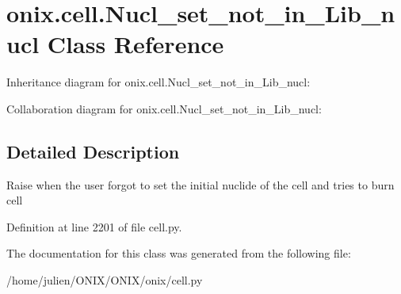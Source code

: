 \hypertarget{classonix_1_1cell_1_1Nucl__set__not__in__Lib__nucl}{}\section{onix.\+cell.\+Nucl\+\_\+set\+\_\+not\+\_\+in\+\_\+\+Lib\+\_\+nucl Class Reference}
\label{classonix_1_1cell_1_1Nucl__set__not__in__Lib__nucl}


Inheritance diagram for onix.\+cell.\+Nucl\+\_\+set\+\_\+not\+\_\+in\+\_\+\+Lib\+\_\+nucl\+:


Collaboration diagram for onix.\+cell.\+Nucl\+\_\+set\+\_\+not\+\_\+in\+\_\+\+Lib\+\_\+nucl\+:


\subsection{Detailed Description}
\begin{DoxyVerb}Raise when the user forgot to set the initial nuclide of the cell and tries to burn cell\end{DoxyVerb}
 

Definition at line 2201 of file cell.\+py.



The documentation for this class was generated from the following file\+:\begin{DoxyCompactItemize}
\item 
/home/julien/\+O\+N\+I\+X/\+O\+N\+I\+X/onix/cell.\+py\end{DoxyCompactItemize}
